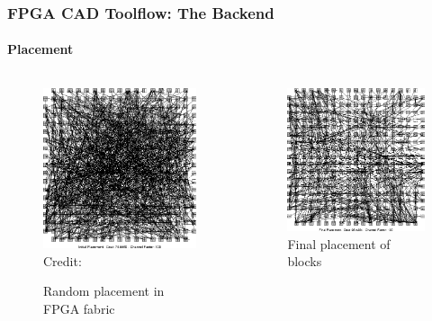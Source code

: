 \documentclass{beamer}
\begin{document}
{\begin{frame}[fragile]
  \frametitle{FPGA CAD Toolflow: The Backend}
  \framesubtitle{Placement}
  \begin{columns}
   \begin{column}{0.5\textwidth}
   \begin{figure}[h]
       \centering
       \includegraphics[width=0.75\linewidth]{images/init_pla.png}
     \hspace*{1pt}\hbox{\scriptsize Credit:} 
       \caption{Random placement in FPGA fabric}
       \label{exa_block3}
    \end{figure}
    \end{column}
   \begin{column}{0.5\textwidth}		
   \begin{figure}[h]
       \centering
       \includegraphics[width=0.75\linewidth]{images/final_pla.png} 
       \caption{Final placement of blocks }
       \label{exa_block4}
    \end{figure}
   \end{column}
   \end{columns}
\end{frame}

}
\end{document}
